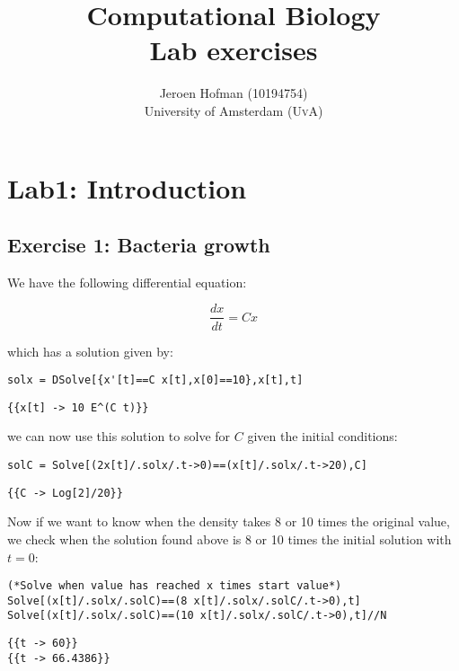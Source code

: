 \documentclass[11pt,a4paper,onecolumn]{article}
\author{Jeroen Hofman (10194754)  \\[15pt] University of Amsterdam (\textsc{UvA})}
\title{Computational Biology\\
  Lab exercises 
		}
\begin{document}
\maketitle
\captionsetup{width=0.8\textwidth}
\thispagestyle{empty}
\graphicspath{{/home/jhofman/Desktop/CompBio/lab1/}{/home/jhofman/Desktop/CompBio/lab2/}{/home/jhofman/Desktop/CompBio/lab3/}{/home/jhofman/Desktop/CompBio/lab4/}{/home/jhofman/Desktop/CompBio/lab5/}}


\newpage
\tableofcontents
\newpage

\section{Lab1: Introduction}
\subsection{Exercise 1: Bacteria growth}

We have the following differential equation:

\begin{equation*}
  \frac{dx}{dt} = C x
\end{equation*}

which has a solution given by:

\begin{lstlisting}[mathescape]
solx = DSolve[{x'[t]==C x[t],x[0]==10},x[t],t]
\end{lstlisting}
\begin{lstlisting}[mathescape]
{{x[t] -> 10 E^(C t)}}
\end{lstlisting}

we can now use this solution to solve for $C$ given the initial conditions:

\begin{lstlisting}[mathescape]
solC = Solve[(2x[t]/.solx/.t->0)==(x[t]/.solx/.t->20),C]
\end{lstlisting}
\begin{lstlisting}[mathescape]
{{C -> Log[2]/20}}
\end{lstlisting}

Now if we want to know when the density takes 8 or 10 times the original value, we check when the solution found above is 8 or 10 times the initial solution with $t = 0$:

\begin{lstlisting}[mathescape]
(*Solve when value has reached x times start value*)
Solve[(x[t]/.solx/.solC)==(8 x[t]/.solx/.solC/.t->0),t]
Solve[(x[t]/.solx/.solC)==(10 x[t]/.solx/.solC/.t->0),t]//N
\end{lstlisting}
\begin{lstlisting}[mathescape]
{{t -> 60}}
{{t -> 66.4386}}
\end{lstlisting}
\end{document}
